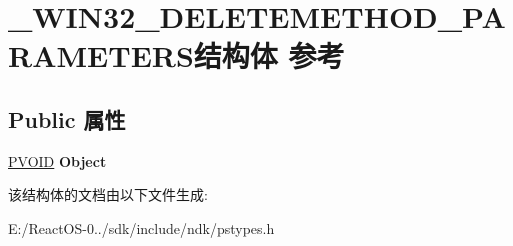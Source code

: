 \hypertarget{struct___w_i_n32___d_e_l_e_t_e_m_e_t_h_o_d___p_a_r_a_m_e_t_e_r_s}{}\section{\+\_\+\+W\+I\+N32\+\_\+\+D\+E\+L\+E\+T\+E\+M\+E\+T\+H\+O\+D\+\_\+\+P\+A\+R\+A\+M\+E\+T\+E\+R\+S结构体 参考}
\label{struct___w_i_n32___d_e_l_e_t_e_m_e_t_h_o_d___p_a_r_a_m_e_t_e_r_s}
\subsection*{Public 属性}
\begin{DoxyCompactItemize}
\item 
\mbox{\label{struct___w_i_n32___d_e_l_e_t_e_m_e_t_h_o_d___p_a_r_a_m_e_t_e_r_s_a950feafb4af6c868d419c273946f5bd9}} 
\hyperlink{interfacevoid}{P\+V\+O\+ID} {\bfseries Object}
\end{DoxyCompactItemize}


该结构体的文档由以下文件生成\+:\begin{DoxyCompactItemize}
\item 
E\+:/\+React\+O\+S-\/0../sdk/include/ndk/pstypes.\+h\end{DoxyCompactItemize}
